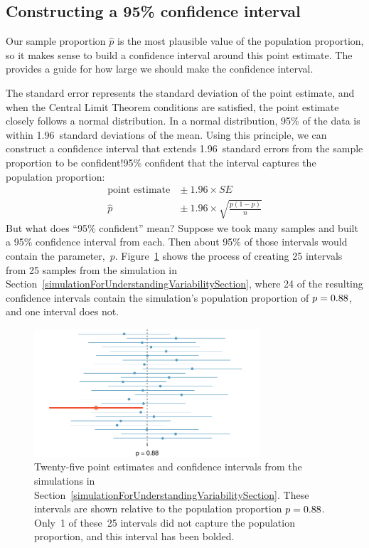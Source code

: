 \subsection{Constructing a 95\% confidence interval}

Our sample proportion $\hat{p}$ is the most plausible
value of the population proportion, so it makes sense
to build a confidence interval around this point estimate.
The  provides a guide for how
large we should make the confidence interval.

The standard error represents the standard deviation
of the point estimate, and when the Central
Limit Theorem conditions are satisfied,
the point estimate closely follows a normal distribution.
In a normal distribution, 95\% of
the data is within 1.96~standard deviations of the mean.
Using this principle, we can construct a confidence
interval that extends 1.96~standard errors from the sample
proportion to be 
    {confident!95\% confident}
that the interval captures the population proportion:
\begin{align*}
\text{point estimate}\ &\pm\ 1.96 \times SE \\
\hat{p}\ &\pm\ 1.96 \times \sqrt{\frac{p (1 - p)}{n}}
\end{align*}
But what does ``95\% confident'' mean? Suppose we took
many samples and built a 95\% confidence interval from
each. Then about 95\% of those intervals would
contain the parameter,~$p$.
Figure~\ref{95PercentConfidenceInterval} shows the
process of creating 25 intervals from 25 samples
from the simulation in
Section~\ref{simulationForUnderstandingVariabilitySection},
where 24 of the resulting confidence intervals contain
the simulation's population proportion of
$p = 0.88{}$, and one interval does not.

\begin{figure}
   \centering
   \includegraphics[width=0.75\textwidth]{ch_foundations_for_inf/figures/95PercentConfidenceInterval/95PercentConfidenceInterval}
   \caption{Twenty-five point estimates and confidence
       intervals from the simulations in
       Section~\ref{simulationForUnderstandingVariabilitySection}.
       These intervals are shown relative to the population
       proportion $p = 0.88{}$.
       Only~1 of these~25
       intervals did not capture the population
       proportion, and this interval has been bolded.}
   \label{95PercentConfidenceInterval}
\end{figure}

